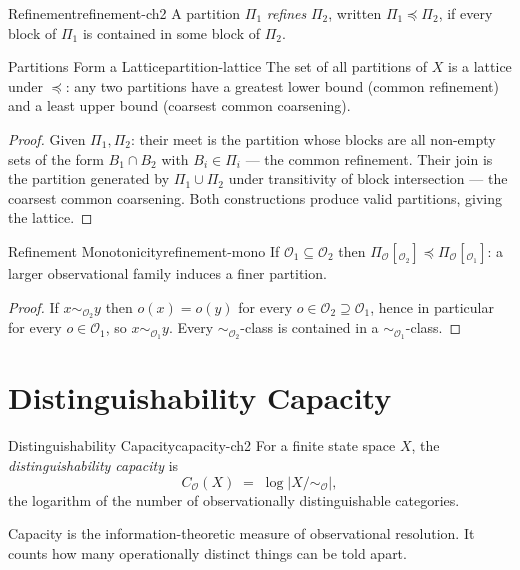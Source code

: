 \documentclass[12pt,twoside,openright]{book}
\newcommand{\obs}{\mathcal{O}}
\providecommand{\partitionObs}{\Pi_{\obs}}
\providecommand{\quotientObs}{X/{\sim_{\obs}}}
\providecommand{\capObs}[1]{C_{\obs}(#1)}
\begin{document}
\begin{definition}{Refinement}{refinement-ch2}
A partition $\Pi_1$ \emph{refines} $\Pi_2$, written
$\Pi_1\preceq\Pi_2$, if every block of $\Pi_1$ is contained
in some block of $\Pi_2$.
\end{definition}

\begin{theorem}{Partitions Form a Lattice}{partition-lattice}
The set of all partitions of $X$ is a lattice under $\preceq$:
any two partitions have a greatest lower bound (common
refinement) and a least upper bound (coarsest common
coarsening).
\begin{proof}
Given $\Pi_1,\Pi_2$: their meet is the partition whose blocks
are all non-empty sets of the form $B_1\cap B_2$ with
$B_i\in\Pi_i$ --- the common refinement. Their join is the
partition generated by $\Pi_1\cup\Pi_2$ under transitivity
of block intersection --- the coarsest common coarsening. Both
constructions produce valid partitions, giving the lattice.
\end{proof}
\end{theorem}

\begin{theorem}{Refinement Monotonicity}{refinement-mono}
If $\obs_1\subseteq\obs_2$ then
$\partitionObs[_{\obs_2}]\preceq\partitionObs[_{\obs_1}]$:
a larger observational family induces a finer partition.
\begin{proof}
If $x\sim_{\obs_2}y$ then $o(x)=o(y)$ for every
$o\in\obs_2\supseteq\obs_1$, hence in particular for every
$o\in\obs_1$, so $x\sim_{\obs_1}y$. Every
$\sim_{\obs_2}$-class is contained in a $\sim_{\obs_1}$-class.
\end{proof}
\end{theorem}

\section{Distinguishability Capacity}

\begin{definition}{Distinguishability Capacity}{capacity-ch2}
For a finite state space $X$, the \emph{distinguishability
capacity} is
\[
  \capObs{X} \;=\; \log|\quotientObs|,
\]
the logarithm of the number of observationally distinguishable
categories.
\end{definition}

Capacity is the information-theoretic measure of observational
resolution. It counts how many operationally distinct things
can be told apart.
\end{document}
